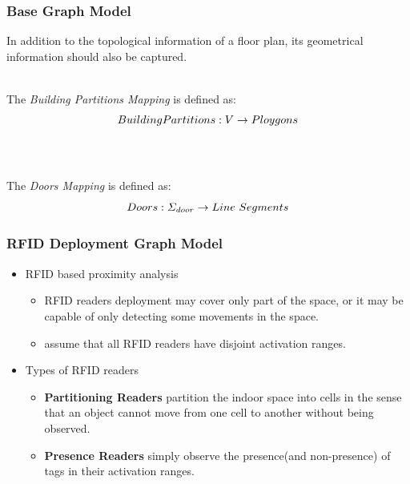 \documentclass{beamer}
\begin{document}


\begin{frame}
\frametitle{Base Graph Model}

\small{In addition to the topological information of a floor plan, its geometrical information should also be captured.}
\\~\\
\pause

The \textrm{\em Building Partitions Mapping} is defined as:
\pause
\begin{equation}
\mathnormal{BuildingPartitions: V \rightarrow Ploygons}
\end{equation}
\\~\\
\pause

The \textrm{\em Doors Mapping} is defined as:
\pause
\begin{equation}
\mathnormal{Doors: \Sigma_{door} \rightarrow Line~Segments}
\end{equation}

\end{frame}



\begin{frame}
\frametitle{RFID Deployment Graph Model}
\begin{itemize}
\item RFID based proximity analysis
    \begin{itemize}
    \item RFID readers deployment may cover only part of the space, or it may be capable of only detecting some movements in the space.
    \item assume that all RFID readers have disjoint activation ranges.
    \end{itemize}
\item Types of RFID readers
    \begin{itemize}
    \item \textbf{Partitioning Readers} partition the indoor space into cells in the sense that an object cannot move from one cell to another without being observed.
    \item \textbf{Presence Readers} simply observe the presence(and non-presence) of tags in their activation ranges.
    \end{itemize}
\end{itemize}
\end{frame}
\end{document}
